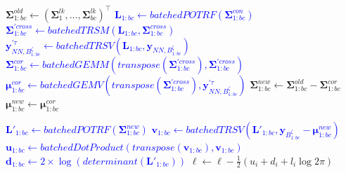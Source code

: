 \documentclass[12pt]{article}
\begin{document}
\begin{algorithm}[H]
\begin{algorithmic}[1]
\hrulefill\hrulefill\hrulefill\hrulefill\hrulefill\hrulefill \hrulefill\hrulefill\hrulefill\hrulefill\hrulefill\hrulefill\hrulefill{}
\State  $\bm\Sigma^{old}_{1:bc} \gets \left(\bm \Sigma^{lk}_{1}, \ldots, \bm \Sigma^{lk}_{bc}\right)^\top$
\textcolor{blue}{
    \State $ \bm L_{1:bc} \gets batchedPOTRF(\bm \Sigma^{con}_{1:bc})$ 
    \State $ \bm \Sigma^{'cross}_{1:bc} \gets batchedTRSM(\bm L_{1:bc}, \bm \Sigma^{cross}_{1:bc})$
    \State $ \boldsymbol{y}^{'\tau}_{NN, B^{\zeta}_{1:bc}} \gets batchedTRSV(\bm L_{1:bc}, \boldsymbol{y}_{NN, B^{\zeta}_{1:bc}})$
    \State $ \bm \Sigma^{cor}_{1:bc} \gets batchedGEMM \left(transpose(\bm \Sigma^{'cross}_{1:bc}), \bm \Sigma^{'cross}_{1:bc}\right)$
    \State $ \bm \mu^{cor}_{1:bc} \gets batchedGEMV \left( transpose(\bm \Sigma^{'cross}_{1:bc}), \boldsymbol{y}^{'\tau}_{NN, B^{\zeta}_{1:bc}} \right)$
}
\State  $\bm\Sigma^{new}_{1:bc} \gets \bm\Sigma^{old}_{1:bc} - \bm \Sigma^{cor}_{1:bc}$ 
\State  $\bm\mu^{new}_{1:bc} \gets \bm \mu^{cor}_{1:bc}$ 

\hrulefill\hrulefill\hrulefill\hrulefill\hrulefill\hrulefill \hrulefill\hrulefill\hrulefill\hrulefill\hrulefill\hrulefill\hrulefill{}

\textcolor{blue}{
    \State $ \bm L'_{1:bc} \gets batchedPOTRF(\bm\Sigma^{new}_{1:bc})$ 
    \State $ \bm v_{1:bc} \gets batchedTRSV(\bm L'_{1:bc}, \boldsymbol{y}_{B^{\zeta}_{1:bc}} - \bm\mu^{new}_{1:bc})$
    \State $ \bm u_{1:bc} \gets batchedDotProduct \left( transpose(\bm v_{1:bc}), \bm v_{1:bc} \right)$
    \State $ \bm d_{1:bc}  \gets 2\times \log(determinant(\bm L'_{1:bc}))$
}
    \State $\ell \gets  \ell - \frac{1}{2}\left( u_i  + d_i + l_i\log 2\pi \right)$
\EndWhile



\end{algorithmic}
\end{algorithm}
\end{document}
